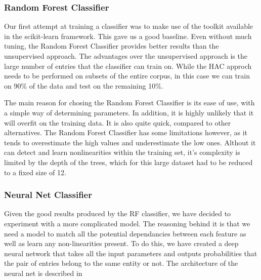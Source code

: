 \subsubsection {Random Forest Classifier}
Our first attempt at training a classifier was to make use of the toolkit available
in the scikit-learn framework. This gave us a good baseline. Even without much
tuning, the Random Forest Classifier provides better results than the unsupervised
approach. The advantages over the unsupervised approach is the large number of
entries that the classifier can train on. While the HAC approch needs to be performed
on subsets of the entire corpus, in this case we can train on 90\% of the data
and test on the remaining 10\%.

The main reason for chosing the Random Forest Classifier\cite{horning2010random}
is its ease of use, with a simple way of determining parameters. In addition,
it is highly unlikely that it
will overfit on the training data. It is also quite quick, compared to other
alternatives. The Random Forest Classifier has some limitations however, as it
tends to overestimate the high values and underestimate the low ones. Althout
it can detect and learn nonlinearities within the training set, it's complexity is
limited by the depth of the trees, which for this large dataset had to be reduced
to a fixed size of 12.

\subsubsection {Neural Net Classifier}
Given the good results produced by the RF classifier, we have decided to experiment
with a more complicated model. The reasoning behind it is that we need a model
to match all the potential dependancies between each feature as well as learn
any non-linearities present. To do this, we have created a deep neural network
that takes all the input parameters and outputs probabilities that the pair
of entries belong to the same entity or not. The architecture of the neural net
is described in 


